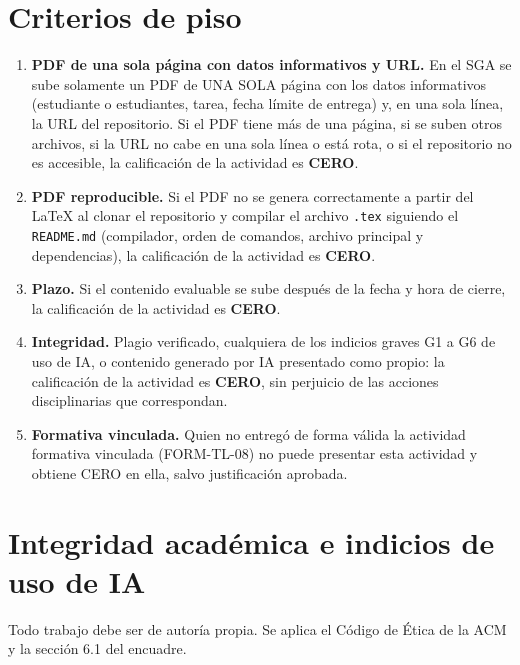 \documentclass[11pt]{article}
\newcommand{\seccion}[1]{\section{\textcolor{utegreendk}{#1}}}
\begin{document}
\seccion{Criterios de piso}

\begin{cajapiso}[title={Criterios de piso: su incumplimiento implica calificación CERO en la actividad}]
	\begin{enumerate}[label=\textbf{P\arabic*.},leftmargin=24pt,itemsep=3pt]
		\item \textbf{PDF de una sola página con datos informativos y URL.} En el SGA se sube solamente un PDF de UNA SOLA página con los datos informativos (estudiante o estudiantes, tarea, fecha límite de entrega) y, en una sola línea, la URL del repositorio. Si el PDF tiene más de una página, si se suben otros archivos, si la URL no cabe en una sola línea o está rota, o si el repositorio no es accesible, la calificación de la actividad es \textbf{CERO}.
		\item \textbf{PDF reproducible.} Si el PDF no se genera correctamente a partir del \LaTeX{} al clonar el repositorio y compilar el archivo \texttt{.tex} siguiendo el \texttt{README.md} (compilador, orden de comandos, archivo principal y dependencias), la calificación de la actividad es \textbf{CERO}.
		\item \textbf{Plazo.} Si el contenido evaluable se sube después de la fecha y hora de cierre, la calificación de la actividad es \textbf{CERO}.
		\item \textbf{Integridad.} Plagio verificado, cualquiera de los indicios graves G1 a G6 de uso de IA, o contenido generado por IA presentado como propio: la calificación de la actividad es \textbf{CERO}, sin perjuicio de las acciones disciplinarias que correspondan.
		\item \textbf{Formativa vinculada.} Quien no entregó de forma válida la actividad formativa vinculada (FORM-TL-08) no puede presentar esta actividad y obtiene CERO en ella, salvo justificación aprobada.
	\end{enumerate}
\end{cajapiso}

\seccion{Integridad académica e indicios de uso de IA}

Todo trabajo debe ser de autoría propia. Se aplica el Código de Ética de la ACM \citep{acm_code_2018} y la sección 6.1 del encuadre.
\end{document}
